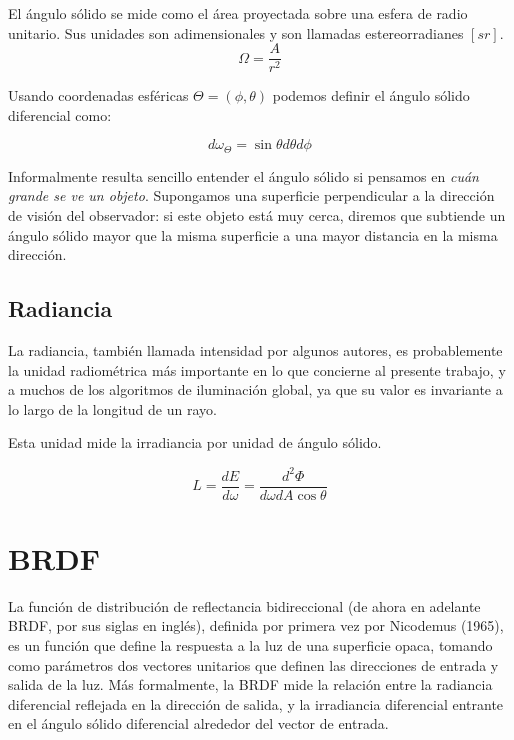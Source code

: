 El ángulo sólido se mide como el área proyectada sobre una esfera de radio unitario. Sus unidades son adimensionales y son llamadas estereorradianes $[sr]$.
\begin{equation}
\Omega = \frac{A}{r^2}
\end{equation}


Usando coordenadas esféricas $\Theta = (\phi , \theta )$ podemos definir el ángulo sólido diferencial como:

\begin{equation}
d \omega _ \Theta = \sin \theta d \theta d \phi
\end{equation}

Informalmente resulta sencillo entender el ángulo sólido si  pensamos en \emph{cuán grande se ve un objeto}. Supongamos una superficie perpendicular a la dirección de visión del observador: si  este objeto está muy cerca, diremos que subtiende un ángulo sólido mayor que la misma superficie a una mayor distancia en la misma dirección.

\clearpage

\subsection{Radiancia}

La radiancia, también llamada intensidad por algunos autores, es probablemente la unidad radiométrica más importante en lo que concierne al presente trabajo, y a muchos de los algoritmos de iluminación global, ya que su valor es invariante a lo largo de la longitud de un rayo.

Esta unidad mide la irradiancia por unidad de ángulo sólido.

\begin{equation}
L = \frac{dE}{d\omega} = \frac{d^2\Phi}{d\omega dA\cos \theta} 
\end{equation}


\clearpage

\section{BRDF}

La función de distribución de reflectancia bidireccional (de ahora en adelante BRDF, por sus siglas en inglés), definida por primera vez por \nocite{Nicodemus1965} Nicodemus (1965), es un función que define la respuesta a la luz de una superficie opaca, tomando como parámetros dos vectores unitarios que definen las direcciones de entrada y salida de la luz. Más formalmente, la BRDF mide la relación entre la radiancia diferencial reflejada en la dirección de salida, y la irradiancia diferencial entrante en el ángulo sólido diferencial alrededor del vector de entrada.


